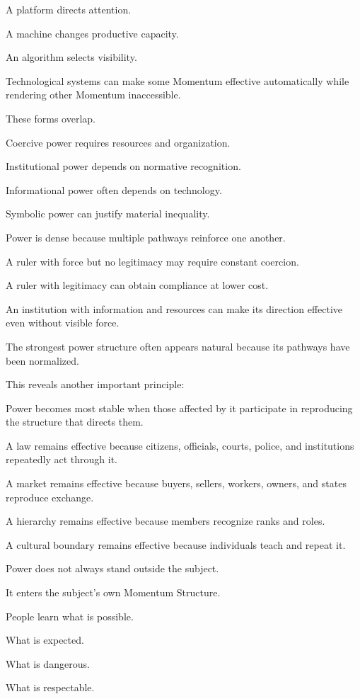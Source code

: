 A platform directs attention.

A machine changes productive capacity.

An algorithm selects visibility.

Technological systems can make some Momentum effective automatically while rendering other Momentum inaccessible.

These forms overlap.

Coercive power requires resources and organization.

Institutional power depends on normative recognition.

Informational power often depends on technology.

Symbolic power can justify material inequality.

Power is dense because multiple pathways reinforce one another.

A ruler with force but no legitimacy may require constant coercion.

A ruler with legitimacy can obtain compliance at lower cost.

An institution with information and resources can make its direction effective even without visible force.

The strongest power structure often appears natural because its pathways have been normalized.

This reveals another important principle:

Power becomes most stable when those affected by it participate in reproducing the structure that directs them.

A law remains effective because citizens, officials, courts, police, and institutions repeatedly act through it.

A market remains effective because buyers, sellers, workers, owners, and states reproduce exchange.

A hierarchy remains effective because members recognize ranks and roles.

A cultural boundary remains effective because individuals teach and repeat it.

Power does not always stand outside the subject.

It enters the subject’s own Momentum Structure.

People learn what is possible.

What is expected.

What is dangerous.

What is respectable.

